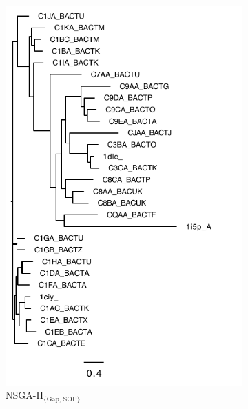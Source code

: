 \begin{figure}[!h]
\begin{adjustwidth}{-1cm}{-1cm}
\begin{subfigure}[b]{0.25\textwidth}
			\includegraphics[width=\columnwidth]{Figure/tree/BB20010_gap_tree}
			\caption{NSGA-II$_{\text{\{Gap, SOP\}}}$}
\end{subfigure}
		\begin{subfigure}[b]{0.25\textwidth}

\end{subfigure}
\end{adjustwidth}
\end{figure}
